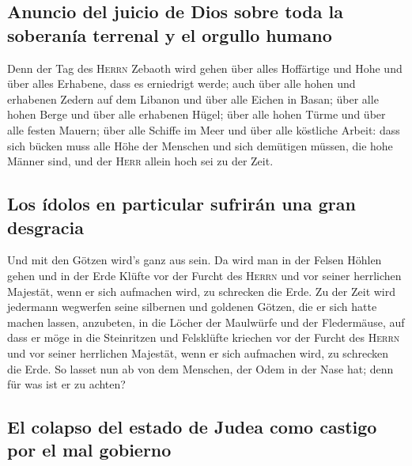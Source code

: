 \hypertarget{anuncio-del-juicio-de-dios-sobre-toda-la-soberanuxeda-terrenal-y-el-orgullo-humano}{%
\subsection{Anuncio del juicio de Dios sobre toda la soberanía terrenal
y el orgullo
humano}\label{anuncio-del-juicio-de-dios-sobre-toda-la-soberanuxeda-terrenal-y-el-orgullo-humano}}

 Denn der Tag des \textsc{Herrn} Zebaoth wird gehen über
alles Hoffärtige und Hohe und über alles Erhabene, dass es erniedrigt
werde;  auch über alle hohen und erhabenen Zedern auf dem
Libanon und über alle Eichen in Basan;  über alle hohen
Berge und über alle erhabenen Hügel;  über alle hohen
Türme und über alle festen Mauern;  über alle Schiffe im
Meer und über alle köstliche Arbeit:  dass sich bücken
muss alle Höhe der Menschen und sich demütigen müssen, die hohe Männer
sind, und der \textsc{Herr} allein hoch sei zu der Zeit.

\hypertarget{los-uxeddolos-en-particular-sufriruxe1n-una-gran-desgracia}{%
\subsection{Los ídolos en particular sufrirán una gran
desgracia}\label{los-uxeddolos-en-particular-sufriruxe1n-una-gran-desgracia}}

 Und mit den Götzen wird's ganz aus sein. 
Da wird man in der Felsen Höhlen gehen und in der Erde Klüfte vor der
Furcht des \textsc{Herrn} und vor seiner herrlichen Majestät, wenn er
sich aufmachen wird, zu schrecken die Erde.  Zu der Zeit
wird jedermann wegwerfen seine silbernen und goldenen Götzen, die er
sich hatte machen lassen, anzubeten, in die Löcher der Maulwürfe und der
Fledermäuse,  auf dass er möge in die Steinritzen und
Felsklüfte kriechen vor der Furcht des \textsc{Herrn} und vor seiner
herrlichen Majestät, wenn er sich aufmachen wird, zu schrecken die Erde.
 So lasset nun ab von dem Menschen, der Odem in der Nase
hat; denn für was ist er zu achten?

\hypertarget{el-colapso-del-estado-de-judea-como-castigo-por-el-mal-gobierno}{%
\subsection{El colapso del estado de Judea como castigo por el mal
gobierno}\label{el-colapso-del-estado-de-judea-como-castigo-por-el-mal-gobierno}}

